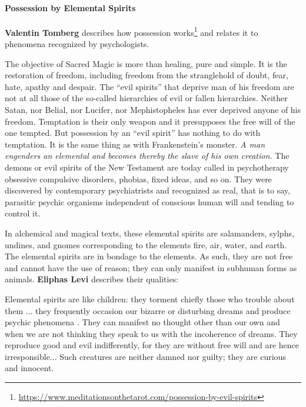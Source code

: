 \paragraph{Possession by Elemental Spirits}


\textbf{Valentin Tomberg} describes how possession works\footnote{\url{https://www.meditationsonthetarot.com/possession-by-evil-spirits}} and relates it to phenomena recognized by psychologists.

\begin{quotex}
The objective of Sacred Magic is more than healing, pure and simple. It is the restoration of freedom, including freedom from the stranglehold of doubt, fear, hate, apathy and despair. The ``evil spirits'' that deprive man of his freedom are not at all those of the so-called hierarchies of evil or fallen hierarchies. Neither Satan, nor Belial, nor Lucifer, nor Mephistopheles has ever deprived anyone of his freedom. Temptation is their only weapon and it presupposes the free will of the one tempted. But possession by an ``evil spirit'' has nothing to do with temptation. It is the same thing as with Frankenstein's monster. \emph{A man engenders an elemental and becomes thereby the slave of his own creation.} The demons or evil spirits of the New Testament are today called in psychotherapy obsessive compulsive disorders, phobias, fixed ideas, and so on. They were discovered by contemporary psychiatrists and recognized as real, that is to say, parasitic psychic organisms independent of conscious human will and tending to control it.
\end{quotex}


In alchemical and magical texts, these elemental spirits are salamanders, sylphs, undines, and gnomes corresponding to the elements fire, air, water, and earth. The elemental spirits are in bondage to the elements. As such, they are not free and cannot have the use of reason; they can only manifest in subhuman forms as animals. \textbf{Eliphas Levi} describes their qualities:

\begin{quotex}
Elemental spirits are like children: they torment chiefly those who trouble about them ... they frequently occasion our bizarre or disturbing dreams and produce psychic phenomena . They can manifest no thought other than our own and when we are not thinking they speak to us with the incoherence of dreams. They reproduce good and evil indifferently, for they are without free will and are hence irresponsible... Such creatures are neither damned nor guilty; they are curious and innocent.
\end{quotex}


